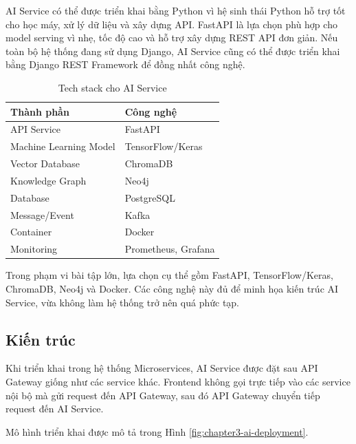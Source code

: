 \documentclass[../main.tex]{subfiles}
\begin{document}
AI Service có thể được triển khai bằng Python vì hệ sinh thái Python hỗ trợ tốt cho học máy, xử lý dữ liệu và xây dựng API. FastAPI là lựa chọn phù hợp cho model serving vì nhẹ, tốc độ cao và hỗ trợ xây dựng REST API đơn giản. Nếu toàn bộ hệ thống đang sử dụng Django, AI Service cũng có thể được triển khai bằng Django REST Framework để đồng nhất công nghệ.

\begin{table}[H]
    \centering
    \caption{Tech stack cho AI Service}
    \label{tab:chapter3-tech-stack}
    \begin{tabular}{|p{}|p{}|}
        \hline
        \rowcolor{primary!35}
        \textbf{Thành phần} & \textbf{Công nghệ} \\
\hline
API Service & FastAPI \\
\hline
Machine Learning Model & TensorFlow/Keras \\
\hline
Vector Database & ChromaDB \\
\hline
Knowledge Graph & Neo4j \\
\hline
Database & PostgreSQL \\
\hline
Message/Event & Kafka \\
\hline
Container & Docker \\
\hline
Monitoring & Prometheus, Grafana \\
\hline
\end{tabular}
\end{table}

Trong phạm vi bài tập lớn, lựa chọn cụ thể gồm FastAPI, TensorFlow/Keras, ChromaDB, Neo4j và Docker. Các công nghệ này đủ để minh họa kiến trúc AI Service, vừa không làm hệ thống trở nên quá phức tạp.

\subsection{Kiến trúc}

Khi triển khai trong hệ thống Microservices, AI Service được đặt sau API Gateway giống như các service khác. Frontend không gọi trực tiếp vào các service nội bộ mà gửi request đến API Gateway, sau đó API Gateway chuyển tiếp request đến AI Service.

Mô hình triển khai được mô tả trong Hình \ref{fig:chapter3-ai-deployment}.
\end{document}

